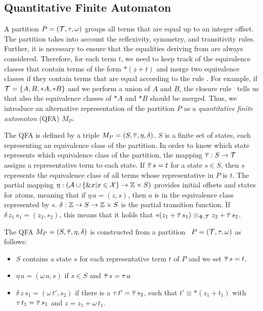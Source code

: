 \subsection{Quantitative Finite Automaton}\label{subsection:qfa}

A partition $P = (\mathcal{T}, \tau, \omega)$ groups all terms that are equal up to an integer offset.
The partition takes into account the reflexivity, symmetry, and transitivity rules.
Further, it is necessary to ensure that the equalities deriving from  are always considered.
Therefore, for each term $t$, we need to keep track of the equivalence classes that contain terms of the form $*(z+t)$ and merge two equivalence classes if they contain terms that are equal according to the rule .
For example, if $\mathcal{T} = \{A, B, *A, *B\}$ and we perform a union of $A$ and $B$, the closure rule~ tells us that also the equivalence classes of $*A$ and $*B$ should be merged.
Thus, we introduce an alternative representation of the partition $P$ as a \emph{quantitative finite automaton} (QFA) $M_P$.

The QFA is defined by a triple $M_P = (S, \overline{\tau}, \eta, \delta)$. $S$ is a finite set of states, each representing an equivalence class of the partition.
In order to know which state represents which equivalence class of the partition, the mapping $\overline{\tau} : S \rightarrow \mathcal{T}$ assigns a representative term to each state.
If $\overline{\tau}\,s = t$ for a state $s \in S$, then $s$ represents the equivalence class of all terms whose representative in $P$ is $t$.
The partial mapping $\eta : (\mathcal{A} \cup \{\&x | x \in \mathcal{X}\} \rightarrow \mathbb{Z} \times S)$ provides initial offsets and states for atoms, meaning that if $\eta\,a = (z,s)$, then $a$ is in the equivalence class represented by $s$.
$\delta : \mathbb{Z} \rightarrow S \rightarrow \mathbb{Z} \times S$ is the partial transition function.
If $\delta\,z_1\,s_1 = (z_2, s_2)$, this means that it holds that $*(z_1 + \overline{\tau}\,s_1) \equiv_{\Psi,\mathcal{T}} z_2 + \overline{\tau}\,s_2$.

The QFA $M_P = (S, \overline{\tau}, \eta, \delta)$ is constructed from a partition  $P = (\mathcal{T}, \tau, \omega)$ as follows:
\begin{itemize}
  \item $S$ contains a state $s$ for each representative term $t$ of $P$ and we set $\overline{\tau}\,s = t$.
  \item $\eta\,a = (\omega\,a, s)$ if $s \in S$ and $\overline{\tau}\,s = \tau\,a$
  \item $\delta\,z\,s_1 = (\omega\,t', s_2)$ if there is a $\tau\,t'=\overline{\tau}\,s_2$, such that $t' \equiv *(z_1 + t_1)$ with $\tau \,t_1= \overline{\tau}\,s_1$ and $z = z_1 + \omega\,t_1$.
\end{itemize}

